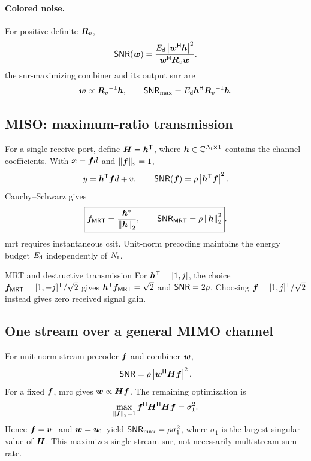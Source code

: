 \paragraph{Colored noise.}
For positive-definite $\bm{R}_v$,
\begin{equation}
	\mathsf{SNR}(\bm{w})
	=\frac{E_{\mathsf{d}}\left|{\bm{w}}^{\mathsf{H}}\bm{h}\right|^2}
	{{\bm{w}}^{\mathsf{H}}\bm{R}_v\bm{w}}  .
\end{equation}
the \ac{snr}-maximizing
combiner and its output \ac{snr} are
\begin{equation*}
	\bm{w}\propto{\bm{R}_v}^{-1}\bm{h},\qquad
	\mathsf{SNR}_{\max}=E_{\mathsf{d}}{\bm{h}}^{\mathsf{H}}{\bm{R}_v}^{-1}\bm{h}.
\end{equation*}

\subsection{MISO: maximum-ratio transmission}
For a single receive port, define $\bm{H}={\bm{h}}^{\mathsf{T}}$,
where $\bm{h}\in\mathbb{C}^{N_{\mathsf{t}}\times1}$ contains the channel
coefficients. With $\bm{x}=\bm{f}d$ and $\left\|\bm{f}\right\|_2=1$,
\begin{equation*}
	y={\bm{h}}^{\mathsf{T}}\bm{f}d+v,\qquad
	\mathsf{SNR}(\bm{f})=\rho\left|{\bm{h}}^{\mathsf{T}}\bm{f}\right|^2.
\end{equation*}
Cauchy--Schwarz gives
\begin{equation}\label{eq:mrt}
	\boxed{\bm{f}_{\mathsf{MRT}}=\frac{{\bm{h}}^{*}}{\left\|\bm{h}\right\|_2},
		\qquad \mathsf{SNR}_{\mathsf{MRT}}=\rho\left\|\bm{h}\right\|_2^2}.
\end{equation}
\ac{mrt} requires instantaneous \ac{csit}. Unit-norm precoding
maintains the energy budget $E_{\mathsf{d}}$ independently of $N_{\mathsf{t}}$.

\begin{example}{MRT and destructive transmission}
	For ${\bm{h}}^{\mathsf{T}}=[1,j]$, the choice
	$\bm{f}_{\mathsf{MRT}}=[1,-j]^{\mathsf T}/\sqrt{2}$ gives
	${\bm{h}}^{\mathsf{T}}\bm{f}_{\mathsf{MRT}}=\sqrt{2}$ and $\mathsf{SNR}=2\rho$.
	Choosing $\bm{f}=[1,j]^{\mathsf T}/\sqrt{2}$ instead gives zero
	received signal gain.
\end{example}

\subsection{One stream over a general MIMO channel}
For unit-norm stream precoder $\bm{f}$ and combiner $\bm{w}$,
\begin{equation}\label{eq:single}
	\mathsf{SNR}=\rho\left|{\bm{w}}^{\mathsf{H}}\bm{H}\bm{f}\right|^2.
\end{equation}
For a fixed $\bm{f}$, \ac{mrc} gives
$\bm{w}\propto\bm{H}\bm{f}$. The remaining optimization is
\begin{equation*}
	\max_{\left\|\bm{f}\right\|_2=1}
	{\bm{f}}^{\mathsf{H}}{\bm{H}}^{\mathsf{H}}\bm{H}\bm{f}=\sigma_1^2.
\end{equation*}
Hence $\bm{f}=\bm{v}_1$ and $\bm{w}=\bm{u}_1$ yield
$\mathsf{SNR}_{\max}=\rho\sigma_1^2$, where $\sigma_1$ is the largest
singular value of $\bm{H}$. This maximizes single-stream \ac{snr},
not necessarily multistream sum rate.

